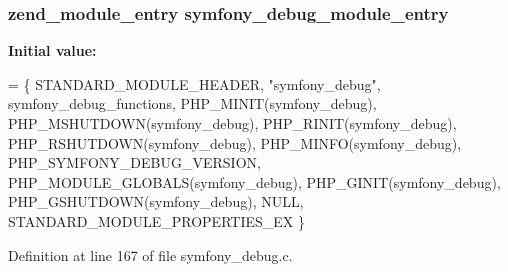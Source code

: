 \subsubsection[{symfony\+\_\+debug\+\_\+module\+\_\+entry}]{\setlength{\rightskip}{0pt plus 5cm}zend\+\_\+module\+\_\+entry symfony\+\_\+debug\+\_\+module\+\_\+entry}\label{symfony__debug_8c_a40ef7165df26239f7a91490c053297bb}
{\bfseries Initial value\+:}
\begin{DoxyCode}
= \{
    STANDARD\_MODULE\_HEADER,
    \textcolor{stringliteral}{"symfony\_debug"},
    symfony_debug_functions,
    PHP\_MINIT(symfony\_debug),
    PHP\_MSHUTDOWN(symfony\_debug),
    PHP\_RINIT(symfony\_debug),
    PHP\_RSHUTDOWN(symfony\_debug),
    PHP\_MINFO(symfony\_debug),
    PHP_SYMFONY_DEBUG_VERSION,
    PHP\_MODULE\_GLOBALS(symfony\_debug),
    PHP\_GINIT(symfony\_debug),
    PHP\_GSHUTDOWN(symfony\_debug),
    NULL,
    STANDARD\_MODULE\_PROPERTIES\_EX
\}
\end{DoxyCode}


Definition at line 167 of file symfony\+\_\+debug.\+c.

